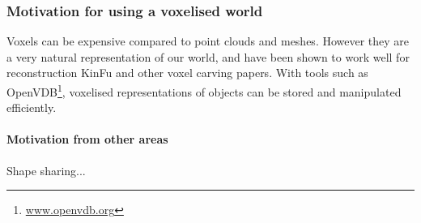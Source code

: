 \documentclass[10pt,twocolumn,letterpaper]{article}
\begin{document}



\subsubsection{Motivation for using a voxelised world}

Voxels can be expensive compared to point clouds and meshes. 
However they are a very natural representation of our world, and have been shown to work well for reconstruction \eg KinFu and other voxel carving papers. 
With tools such as OpenVDB\footnote{\url{www.openvdb.org}}, voxelised representations of objects can be stored and manipulated efficiently.






\paragraph{Motivation from other areas}
Shape sharing...
\end{document}
